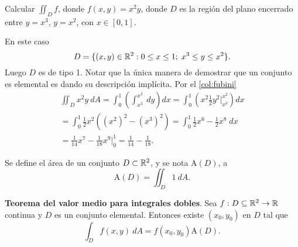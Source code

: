 \begin{example}
    Calcular $\iint_D f$, donde $f(x,y)=x^2y$, donde $D$ es la regi\'on del plano encerrado entre $y=x^3$, $y=x^2$, con $x\in[0,1]$. 

    \begin{center}
    \end{center}

    En este caso 
    \[
        D=\{(x,y)\in\mathbb{R}^2:0\leq x\leq1;\;x^3\leq y\leq x^2\}.  
    \]
    Luego $D$ es de tipo 1. Notar que la \'unica manera de demostrar que un conjunto es elemental es dando su descripci\'on impl\'icita. Por el \autoref{col:fubini}
    \begin{gather*}
        \iint_D x^2y\:dA=\int_0^1\left(\int_{x^3}^{x^2}\:dy\right)dx=\int_0^1\left(x^2\frac{1}{2}y^2\Big\lvert_{x^3}^{x^2}\right)dx\\
        =\int_0^1\frac{1}{2}x^2\left((x^2)^2-(x^3)^2\right)=\int_0^1\frac{1}{2}x^6-\frac{1}{2}x^8\;dx\\=\frac{1}{14}x^7-\frac{1}{18}x^9\Big\lvert_0^1=\frac{1}{14}-\frac{1}{18}.
    \end{gather*}
\end{example}
\begin{definition} %
    Se define el \'area de un conjunto $D\subset\mathbb{R}^2$, y se nota $\text{A}(D)$, a  
    \[
        \text{A}(D)=\iint_D1\:dA.
    \]
\end{definition}
\begin{theorem}
    \textbf{Teorema del valor medio para integrales dobles}. Sea $f:D\subseteq\mathbb{R}^2\to\mathbb{R}$ continua y $D$ es un conjunto elemental. Entonces existe $(x_0,y_0)$ en $D$ tal que
    \[
        \int_D f(x,y)\:dA=f(x_0,y_0)\text{A}(D).
    \]
\end{theorem}


